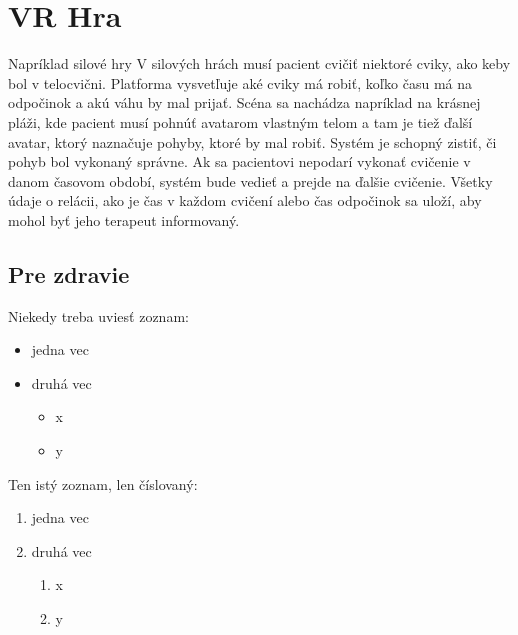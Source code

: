 \documentclass[10pt,oneside,slovak,a4paper]{article}
\begin{document}
\section{VR Hra} \label{VR rehabilitácie}
Napríklad
silové hry
V silových hrách musí pacient cvičiť niektoré cviky, ako keby bol v telocvični. Platforma vysvetľuje
aké cviky má robiť, koľko času má na odpočinok a akú váhu by mal prijať.
Scéna sa nachádza napríklad na krásnej pláži, kde pacient musí pohnúť avatarom vlastným telom a tam je
tiež ďalší avatar, ktorý naznačuje pohyby, ktoré by mal robiť.
Systém je schopný zistiť, či 
pohyb bol vykonaný správne. Ak sa pacientovi nepodarí vykonať cvičenie v danom časovom období,
systém bude vedieť a prejde na ďalšie cvičenie. Všetky údaje o relácii, ako je čas v každom cvičení alebo čas
odpočinok sa uloží, aby mohol byť jeho terapeut informovaný.



\subsection{Pre zdravie} \label{Pre zdravie}

Niekedy treba uviesť zoznam:

\begin{itemize}
\item jedna vec
\item druhá vec
	\begin{itemize}
	\item x
	\item y
	\end{itemize}
\end{itemize}

Ten istý zoznam, len číslovaný:

\begin{enumerate}
\item jedna vec
\item druhá vec
	\begin{enumerate}
	\item x
	\item y
	\end{enumerate}
\end{enumerate}
\end{document}
